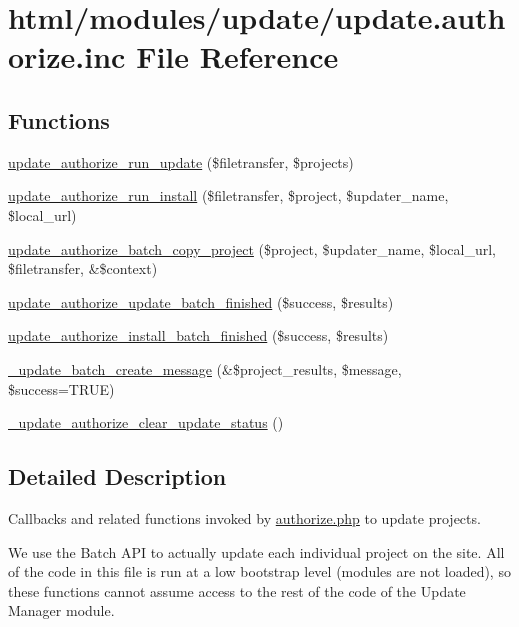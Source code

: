 \hypertarget{update_8authorize_8inc}{
\section{html/modules/update/update.authorize.inc File Reference}
\label{update_8authorize_8inc}
}
\subsection*{Functions}
\begin{DoxyCompactItemize}
\item 
\hyperlink{update_8authorize_8inc_a640c629480dadbca39814ac8be63e21b}{update\_\-authorize\_\-run\_\-update} (\$filetransfer, \$projects)
\item 
\hyperlink{update_8authorize_8inc_a284ce6e21de87c3f0e39bbde1a1b6556}{update\_\-authorize\_\-run\_\-install} (\$filetransfer, \$project, \$updater\_\-name, \$local\_\-url)
\item 
\hyperlink{update_8authorize_8inc_ad3fccf701ff21f38940f28a72998d2b2}{update\_\-authorize\_\-batch\_\-copy\_\-project} (\$project, \$updater\_\-name, \$local\_\-url, \$filetransfer, \&\$context)
\item 
\hyperlink{update_8authorize_8inc_af57a6cf83861d59b3aa904b3d68c1f73}{update\_\-authorize\_\-update\_\-batch\_\-finished} (\$success, \$results)
\item 
\hyperlink{update_8authorize_8inc_a5fa685f8381c4bb3cd5e2a237e82e5a4}{update\_\-authorize\_\-install\_\-batch\_\-finished} (\$success, \$results)
\item 
\hyperlink{update_8authorize_8inc_a52e1e0077fe627d777ce1089da0c6b9d}{\_\-update\_\-batch\_\-create\_\-message} (\&\$project\_\-results, \$message, \$success=TRUE)
\item 
\hyperlink{update_8authorize_8inc_a040122d69ea274f33e081405f8f522ee}{\_\-update\_\-authorize\_\-clear\_\-update\_\-status} ()
\end{DoxyCompactItemize}


\subsection{Detailed Description}
Callbacks and related functions invoked by \hyperlink{authorize_8php}{authorize.php} to update projects.

We use the Batch API to actually update each individual project on the site. All of the code in this file is run at a low bootstrap level (modules are not loaded), so these functions cannot assume access to the rest of the code of the Update Manager module. 

